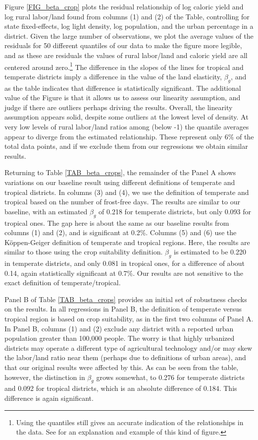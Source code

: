 \documentclass[11pt]{article}
\begin{document}
Figure \ref{FIG_beta_crop} plots the residual relationship of log caloric yield and log rural labor/land found from columns (1) and (2) of the Table, controlling for state fixed-effects, log light density, log population, and the urban percentage in a district. Given the large number of observations, we plot the average values of the residuals for 50 different quantiles of our data to make the figure more legible, and as these are residuals the values of rural labor/land and caloric yield are all centered around zero.\footnote{Using the quantiles still gives an accurate indication of the relationships in the data. See \citet{cfs2013} for an explanation and example of this kind of figure.} The difference in the slopes of the lines for tropical and temperate districts imply a difference in the value of the land elasticity, $\beta_g$, and as the table indicates that difference is statistically significant. The additional value of the Figure is that it allows us to assess our linearity assumption, and judge if there are outliers perhaps driving the results. Overall, the linearity assumption appears solid, despite some outliers at the lowest level of density. At very low levels of rural labor/land ratios among (below -1) the quantile averages appear to diverge from the estimated relationship. These represent only 6\% of the total data points, and if we exclude them from our regressions we obtain similar results.

Returning to Table \ref{TAB_beta_crops}, the remainder of the Panel A shows variations on our baseline result using different definitions of temperate and tropical districts. In columns (3) and (4), we use the definition of temperate and tropical based on the number of frost-free days. The results are similar to our baseline, with an estimated $\beta_g$ of 0.218 for temperate districts, but only 0.093 for tropical ones. The gap here is about the same as our baseline results from columns (1) and (2), and is significant at 0.2\%. Columns (5) and (6) use the K{\"o}ppen-Geiger definition of temperate and tropical regions. Here, the results are similar to those using the crop suitability definition. $\beta_g$ is estimated to be 0.220 in temperate districts, and only 0.081 in tropical ones, for a difference of about 0.14, again statistically significant at 0.7\%. Our results are not sensitive to the exact definition of temperate/tropical.

Panel B of Table \ref{TAB_beta_crops} provides an initial set of robustness checks on the results. In all regressions in Panel B, the definition of temperate versus tropical region is based on crop suitability, as in the first two columns of Panel A. In Panel B, columns (1) and (2) exclude any district with a reported urban population greater than 100,000 people. The worry is that highly urbanized districts may operate a different type of agricultural technology and/or may skew the labor/land ratio near them (perhaps due to definitions of urban areas), and that our original results were affected by this. As can be seen from the table, however, the distinction in $\beta_g$ grows somewhat, to 0.276 for temperate districts and 0.092 for tropical districts, which is an absolute difference of 0.184. This difference is again significant.
\end{document}
